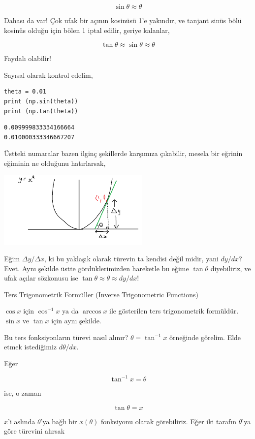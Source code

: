\documentclass[12pt,fleqn]{article}\usepackage{../../common}
\begin{document}
$$
\sin\theta \approx \theta
$$

Dahası da var! Çok ufak bir açının kosinüsü 1'e yakındır, ve tanjant sinüs bölü
kosinüs olduğu için bölen 1 iptal edilir, geriye kalanlar,

$$
\tan\theta \approx \sin\theta \approx \theta
$$

Faydalı olabilir!

Sayısal olarak kontrol edelim,

\begin{verbatim}
theta = 0.01
print (np.sin(theta))
print (np.tan(theta))
\end{verbatim}

\begin{verbatim}
0.009999833334166664
0.010000333346667207
\end{verbatim}

Üstteki numaralar bazen ilginç şekillerde karşımıza çıkabilir, mesela bir
eğrinin eğiminin ne olduğunu hatırlarsak,

\includegraphics[width=20em]{slope_tan.png}

Eğim $\Delta y / \Delta x$, ki bu yaklaşık olarak türevin ta kendisi değil
midir, yani $dy / dx$? Evet. Aynı şekilde üstte gördüklerimizden hareketle
bu eğime $\tan\theta$ diyebiliriz, ve ufak açılar sözkonusu ise
$\tan\theta \approx \theta \approx dy / dx$!

Ters Trigonometrik Formüller (Inverse Trigonometric Functions)

$\cos x$ için $\cos^{-1} x$ ya da $\arccos x$ ile gösterilen ters
trigonometrik formüldür. $\sin x$ ve $\tan x$ için aynı şekilde. 

Bu ters fonksiyonların türevi nasıl alınır? $\theta = \tan^{-1}x$ örneğinde
görelim. Elde etmek istediğimiz $d\theta/dx$. 

Eğer

$$ \tan^{-1}x = \theta$$

ise, o zaman 

$$ \tan\theta = x $$

$x$'i aslında $\theta$'ya bağlı bir $x(\theta)$ fonksiyonu olarak görebiliriz. 
Eğer iki tarafın $\theta$'ya göre türevini alırsak
\end{document}
